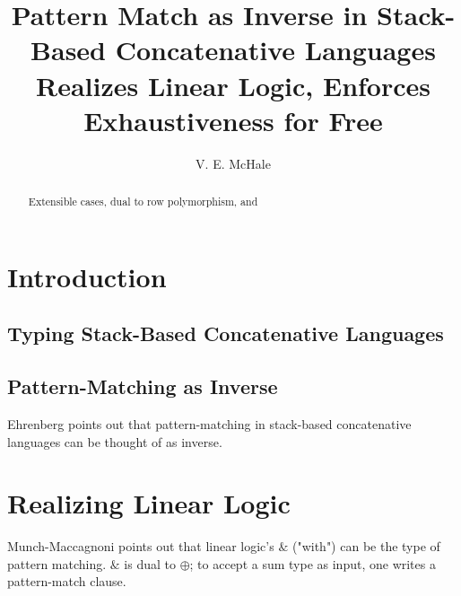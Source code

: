 \documentclass[acmsmall,screen,review]{acmart}
\begin{document}

\begin{abstract}
  Extensible cases, dual to row polymorphism, and
\end{abstract}

\title{Pattern Match as Inverse in Stack-Based Concatenative Languages Realizes Linear Logic, Enforces Exhaustiveness for Free}
\author{V. E. McHale}
\maketitle

\section{Introduction}

\subsection{Typing Stack-Based Concatenative Languages}


\subsection{Pattern-Matching as Inverse}

Ehrenberg \cite{ehrenberg2009} points out that pattern-matching in stack-based concatenative languages can be thought of as inverse.


\section{Realizing Linear Logic}

Munch-Maccagnoni \cite{munchmaccagnoni2009} points out that linear logic's $\&$ ("with") can be the type of pattern matching. $\&$ is dual to $\oplus$; to accept a sum type as input, one writes a pattern-match clause.
\end{document}
